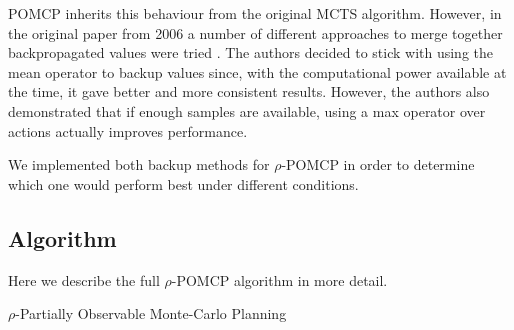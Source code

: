POMCP inherits this behaviour from the original MCTS algorithm. However, in the original paper from
2006 a number of different approaches to merge together backpropagated values were tried
\cite{cit:mcts}. The authors decided to stick with using the mean operator to backup values since,
with the computational power available at the time, it gave better and more consistent results.
However, the authors also demonstrated that if enough samples are available, using a max operator
over actions actually improves performance.

We implemented both backup methods for $\rho$-POMCP in order to determine which one would perform
best under different conditions.

\subsection{Algorithm}

Here we describe the full $\rho$-POMCP algorithm in more detail.

\begin{algorithm}[H]
    \caption{$\rho$-Partially Observable Monte-Carlo Planning}
\begin{multicols}{2}


    \setcounter{AlgoLine}{0}
\end{multicols}
\end{algorithm}

